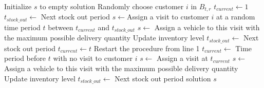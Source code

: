 \documentclass{article}
\begin{document}
\begin{algorithm}[H]
\caption{\textbf{Construct initial schedule}}
\begin{algorithmic}[1]
\STATE Initialize $s$ to empty solution
\REPEAT
\STATE Randomly choose customer $i$ in $B_{t,r}$
\STATE $t_{current}\gets 1$ 
\STATE $t_{stock\_out} \gets$ Next stock out period
\REPEAT
\STATE $s\gets $Assign a visit to customer $i$ at a random time period $t$ between $t_{current}$ and $t_{stock\_out}$
\STATE $s\gets $ Assign a vehicle to this visit with the maximum possible delivery quantity
\STATE Update inventory level  
\STATE $t_{stock\_out}\gets$ Next stock out period
\STATE $t_{current}\gets t$
        \STATE Restart the procedure from line 1
    \ELSE
        \STATE $t_{current}\gets$ Time period before $t$ with no visit to customer $i$ 
        \STATE $s\gets$ Assign a visit at $t_{current}$
        \STATE $s\gets $ Assign a vehicle to this visit with the maximum possible delivery quantity
        \STATE Update inventory level  
        \STATE $t_{stock\_out}\gets$ Next stock out period
    \ENDIF
\ENDIF
{}
\RETURN solution $s$
\end{algorithmic}
\end{algorithm}


\end{document}
